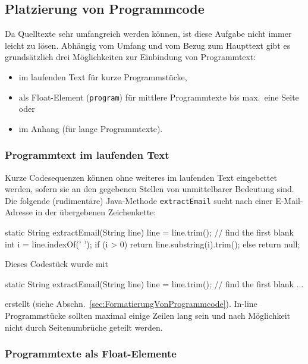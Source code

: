 \subsection{Platzierung von Programmcode}

Da Quelltexte sehr umfangreich werden können, ist diese Aufgabe nicht immer
leicht zu lösen. Abhängig vom Umfang und vom Bezug zum Haupttext gibt es
grundsätzlich drei Möglichkeiten zur Einbindung von Programmtext:
%
\begin{itemize}
	\item[a)] im laufenden Text für kurze Programmstücke,
	\item[b)] als Float-Element (\texttt{program}) für mittlere Programmtexte
	bis max.\ eine Seite oder
	\item[c)] im Anhang (für lange Programmtexte).
\end{itemize}

\subsubsection{Programmtext im laufenden Text}

Kurze Codesequenzen können ohne weiteres im laufenden Text eingebettet
werden, sofern sie an den gegebenen Stellen von unmittelbarer Bedeutung sind.
Die folgende (rudimentäre) Java-Methode \texttt{extractEmail} sucht nach
einer E-Mail-Adresse in der übergebenen Zeichenkette:
%
\begin{JavaCode}[numbers=none]
static String extractEmail(String line) {
    line = line.trim(); // find the first blank
    int i = line.indexOf(' '); 
    if (i > 0)
        return line.substring(i).trim();
    else
        return null;
}
\end{JavaCode}
%
\noindent
Dieses Codestück wurde mit 
%
\begin{LaTeXCode}[numbers=none]
\begin{JavaCode}[numbers=none]
static String extractEmail(String line) {
    line = line.trim(); // find the first blank
    ...
}
\end{JavaCode}
\end{LaTeXCode}
%
erstellt (siehe Abschn.\ \ref{sec:FormatierungVonProgrammcode}). In-line
Programmstücke sollten maximal einige Zeilen lang sein und nach Möglichkeit
nicht durch Seitenumbrüche geteilt werden.


\subsubsection{Programmtexte als Float-Elemente}

